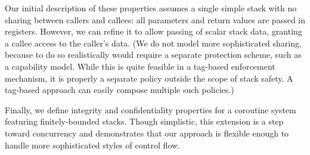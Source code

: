 \documentclass[acmsmall,review,anonymous]{acmart}\settopmatter{printfolios=true,printccs=false,printacmref=false}
\begin{document}
Our initial description of these properties assumes a single simple stack with no sharing between callers and
callees: all parameters and return values are passed in registers.  However,
we can refine it to allow passing of scalar stack data, granting a callee
access to the caller's data. (We do not model more sophisticated sharing, because to do
so realistically would require a separate protection scheme, such as a capability
model. While this is quite feasible in a tag-based enforcement mechanism, it is properly
a separate policy outside the scope of stack safety. A tag-based approach can easily
compose multiple such policies.)

Finally, we define integrity and confidentiality properties for a coroutine system featuring
finitely-bounded stacks.
Though simplistic, this extension is a step toward concurrency and demonstrates that
our approach is flexible enough to handle more sophisticated styles of
control flow.



\end{document}

